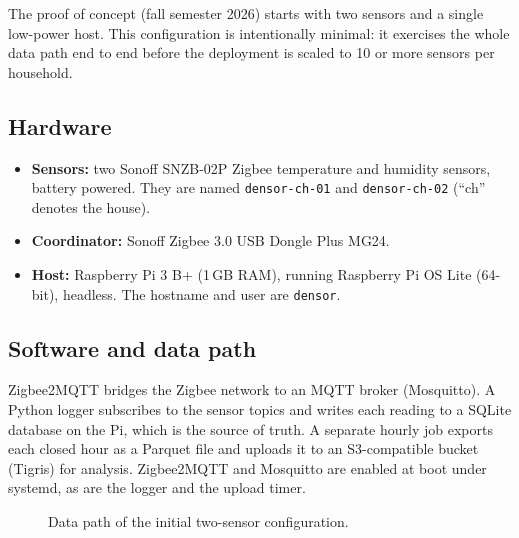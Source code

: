 \documentclass[11pt,letterpaper]{article}
\begin{document}
The proof of concept (fall semester 2026) starts with two sensors and a single
low-power host. This configuration is intentionally minimal: it exercises the
whole data path end to end before the deployment is scaled to 10 or more
sensors per household.

\subsection{Hardware}

\begin{itemize}
  \item \textbf{Sensors:} two Sonoff SNZB-02P Zigbee temperature and humidity
    sensors, battery powered. They are named \texttt{densor-ch-01} and
    \texttt{densor-ch-02} (``ch'' denotes the house).
  \item \textbf{Coordinator:} Sonoff Zigbee 3.0 USB Dongle Plus MG24.
  \item \textbf{Host:} Raspberry Pi 3 B+ (1\,GB RAM), running Raspberry Pi OS
    Lite (64-bit), headless. The hostname and user are \texttt{densor}.
\end{itemize}

\subsection{Software and data path}

Zigbee2MQTT bridges the Zigbee network to an MQTT broker (Mosquitto). A Python
logger subscribes to the sensor topics and writes each reading to a SQLite
database on the Pi, which is the source of truth. A separate hourly job exports
each closed hour as a Parquet file and uploads it to an S3-compatible bucket
(Tigris) for analysis. Zigbee2MQTT and Mosquitto are enabled at boot under
systemd, as are the logger and the upload timer.

\begin{figure}[ht]
\centering
{}
\caption{Data path of the initial two-sensor configuration.}
\label{fig:datapath}
\end{figure}
\end{document}
